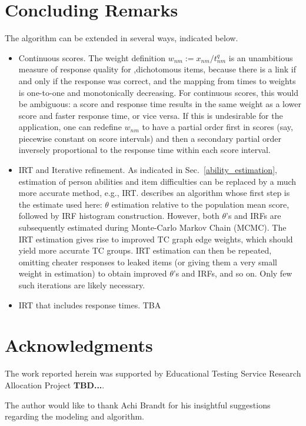 \documentclass{article}
\begin{document}
\section{Concluding Remarks}
\label{remarks}
The algorithm can be extended in several ways, indicated below.
\begin{itemize}
	\item {Continuous scores.} The weight definition $w_{nm} := x_{nm}/t_{nm}^q$ is an unambitious measure of response quality for ,dichotomous items, because there is a link if and only if the response was correct, and the mapping from times to weights is one-to-one and monotonically decreasing. For continuous scores, this would be ambiguous: a score and response time results in the same weight as a lower score and faster response time, or vice versa. If this is undesirable for the application, one can redefine $w_{nm}$ to have a partial order first in scores (say, piecewise constant on score intervals) and then a secondary partial order inversely proportional to the response time within each score interval.
	\item {IRT and Iterative refinement.} As indicated in Sec.~\ref{ability_estimation}, estimation of person abilities and item difficulties can be replaced by a much more accurate method, e.g., IRT. \cite{nirt} describes an algorithm whose first step is the estimate used here: $\theta$ estimation relative to the population mean score, followed by IRF histogram construction. However, both $\theta$'s and IRFs are subsequently estimated during Monte-Carlo Markov Chain (MCMC). The IRT estimation gives rise to improved TC graph edge weights, which should yield more accurate TC groups. IRT estimation can then be repeated, omitting cheater responses to leaked items (or giving them a very small weight in estimation) to obtain improved $\theta$'s and IRFs, and so on. Only few such iterations are likely necessary.
	\item {IRT that includes response times.} TBA
	
\end{itemize}

\section{Acknowledgments}
The work reported herein was supported by Educational Testing Service Research Allocation Project {\bf TBD...}.

The author would like to thank Achi Brandt for his insightful suggestions regarding the modeling and algorithm.



\end{document}

